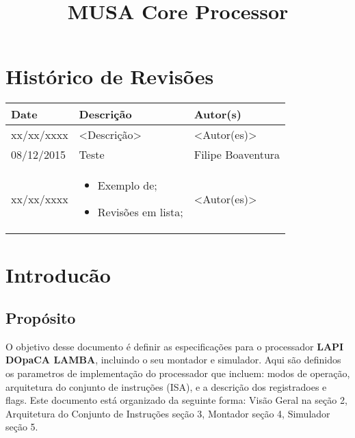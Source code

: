 \documentclass{article}
\title{MUSA Core Processor}
\begin{document}
 \capa

\section*{\center Histórico de Revisões}
  \vspace*{1cm}
  \begin{table}[ht]
    \centering
    \begin{tabular}[pos]{|m{2cm} | m{7.2cm} | m{3.8cm}|} 
      \hline
      \cellcolor[gray]{0.9}
      \textbf{Date} & \cellcolor[gray]{0.9}\textbf{Descrição} & \cellcolor[gray]{0.9}\textbf{Autor(s)}\\ \hline
      \hline
      \small xx/xx/xxxx & \small <Descrição> & \small <Autor(es)> \\ \hline
      \small 08/12/2015 & \small Teste & \small Filipe Boaventura \\ \hline
      \small xx/xx/xxxx &
      \begin{small}
        \begin{itemize}
          \item Exemplo de;
          \item Revisões em lista;
        \end{itemize}
      \end{small} & \small <Autor(es)> \\ \hline 
    \end{tabular}
  \end{table}

\newpage
  
\tableofcontents
\newpage

  \section{Introducão}
  \subsection{Propósito}
  O objetivo desse documento é definir as especificações para o processador \textbf{LAPI DOpaCA LAMBA}, incluindo o seu montador e simulador. Aqui são definidos os parametros de implementação do processador que incluem: modos de operação, arquitetura do conjunto de instruções (ISA), e a descrição dos registradoes e flags.
   Este documento está organizado da seguinte forma: Visão Geral na seção 2, Arquitetura do Conjunto de Instruções seção 3, Montador seção 4, Simulador seção 5.
  
\end{document}
